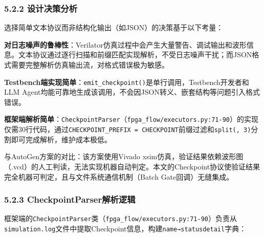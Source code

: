 \subsubsection{5.2.2
设计决策分析}\label{ux8bbeux8ba1ux51b3ux7b56ux5206ux6790}

选择简单文本协议而非结构化输出（如JSON）的决策基于以下考量：

\textbf{对日志噪声的鲁棒性}：Verilator仿真过程中会产生大量警告、调试输出和波形信息。文本协议通过逐行扫描和前缀匹配实现解析，不受日志噪声干扰；而JSON格式需要完整解析仿真输出流，对格式错误极为敏感。

\textbf{Testbench端实现简单}：\texttt{emit\_checkpoint()}是单行调用，Testbench开发者和LLM
Agent均能可靠地生成该调用，不会因JSON转义、嵌套结构等问题引入格式错误。

\textbf{框架端解析简单}：\texttt{CheckpointParser}（\texttt{fpga\_flow/executors.py:71-90}）的实现仅需30行代码，通过\texttt{CHECKPOINT\_PREFIX\ =\ \textquotesingle{}CHECKPOINT\textbar{}\textquotesingle{}}前缀过滤和\texttt{split(\textquotesingle{}\textbar{}\textquotesingle{},\ 3)}分割即可完成解析，维护成本极低。

与AutoGen方案的对比：该方案使用Vivado
xsim仿真，验证结果依赖波形图（.vcd）的人工判读，无法实现机器自动判定。本文的Checkpoint协议使验证结果完全机器可判定，且与文件系统通信机制（Batch
Gate回调）无缝集成。

\subsubsection{5.2.3
CheckpointParser解析逻辑}\label{checkpointparserux89e3ux6790ux903bux8f91}

框架端的\texttt{CheckpointParser}类（\texttt{fpga\_flow/executors.py:71-90}）负责从\texttt{simulation.log}文件中提取Checkpoint信息，构建\texttt{name→status\textbar{}detail}字典：

